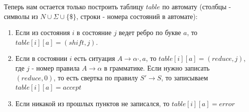 \par Теперь нам остается только построить таблицу $table$ по автомату (столбцы - символы из $N \cup \Sigma \cup \{\$\}$, строки - номера состояний в автомате):
\begin{enumerate}
    \item Если из состояния $i$ в состояние $j$ ведет ребро по букве $a$, то $table[i][a]=(shift, j)$.
    \item Если в состоянии $i$ есть ситуация $A \rightarrow \alpha \cdot, a$, то $table[i][a]=(reduce, j)$, где $j$ - номер правила $A \rightarrow \alpha$ в грамматике. Если нужно записать $(reduce, 0)$, то есть свертка по правилу $S' \rightarrow S$, то записываем $table[i][a]=accept$
    \item Если никакой из прошлых пунктов не записался, то $table[i][a]=error$
\end{enumerate}
\begin{figure}[h]
\end{figure}